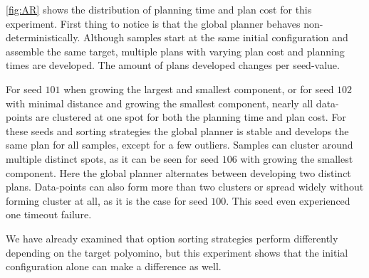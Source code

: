 \autoref{fig:AR} shows the distribution of planning time and plan cost for this experiment.
First thing to notice is that the global planner behaves non-deterministically.
Although samples start at the same initial configuration and assemble the same target, multiple plans with varying plan cost and planning times are developed.
The amount of plans developed changes per seed-value.

For seed $101$ when growing the largest and smallest component, or for seed $102$ with minimal distance and growing the smallest component, nearly all data-points are clustered at one spot for both the planning time and plan cost.
For these seeds and sorting strategies the global planner is stable and develops the same plan for all samples, except for a few outliers.
Samples can cluster around multiple distinct spots, as it can be seen for seed $106$ with growing the smallest component.
Here the global planner alternates between developing two distinct plans.
Data-points can also form more than two clusters or spread widely without forming cluster at all, as it is the case for seed $100$.
This seed even experienced one timeout failure. 

We have already examined that option sorting strategies perform differently depending on the target polyomino, but this experiment shows that the initial configuration alone can make a difference as well.

